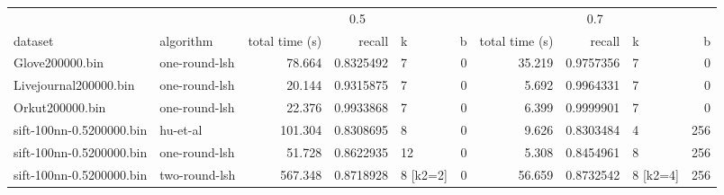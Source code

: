 \begin{table}[H]
\centering
\begin{tabular}[t]{llrrlrrrlr}
\toprule
\multicolumn{2}{c}{ } & \multicolumn{4}{c}{0.5} & \multicolumn{4}{c}{0.7} \\
\cmidrule(l{3pt}r{3pt}){3-6} \cmidrule(l{3pt}r{3pt}){7-10}
dataset & algorithm & total time (s) & recall & k & b & total time (s) & recall & k & b\\
\midrule
Glove200000.bin & one-round-lsh & 78.664 & 0.8325492 & 7 & 0 & 35.219 & 0.9757356 & 7 & 0\\
Livejournal200000.bin & one-round-lsh & 20.144 & 0.9315875 & 7 & 0 & 5.692 & 0.9964331 & 7 & 0\\
Orkut200000.bin & one-round-lsh & 22.376 & 0.9933868 & 7 & 0 & 6.399 & 0.9999901 & 7 & 0\\
sift-100nn-0.5200000.bin & hu-et-al & 101.304 & 0.8308695 & 8 & 0 & 9.626 & 0.8303484 & 4 & 256\\
sift-100nn-0.5200000.bin & one-round-lsh & 51.728 & 0.8622935 & 12 & 0 & 5.308 & 0.8454961 & 8 & 256\\
sift-100nn-0.5200000.bin & two-round-lsh & 567.348 & 0.8718928 & 8 [k2=2] & 0 & 56.659 & 0.8732542 & 8 [k2=4] & 256\\
\bottomrule
\end{tabular}
\end{table}
